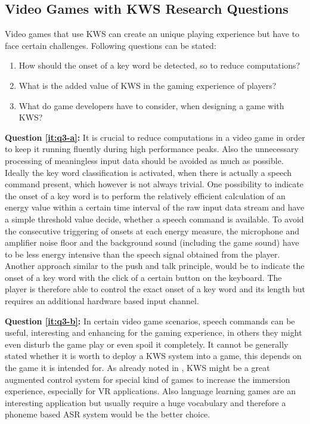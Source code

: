\subsection{Video Games with KWS Research Questions}\label{sec:intro_rq_games}
Video games that use KWS can create an unique playing experience but have to face certain challenges.
Following questions can be stated:
\begin{enumerate}[label={Q.3.\alph*)}, leftmargin=1.75cm]
  \item How should the onset of a key word be detected, so to reduce computations?\label{it:q3-a}
  \item What is the added value of KWS in the gaming experience of players?\label{it:q3-b}
  \item What do game developers have to consider, when designing a game with KWS?\label{it:q3-c}
\end{enumerate}
\noindent
\textbf{Question \ref{it:q3-a}:} 
It is crucial to reduce computations in a video game in order to keep it running fluently during high performance peaks.
Also the unnecessary processing of meaningless input data should be avoided as much as possible.
Ideally the key word classification is activated, when there is actually a speech command present, which however is not always trivial.
One possibility to indicate the onset of a key word is to perform the relatively efficient calculation of an energy value within a certain time interval of the raw input data stream and have a simple threshold value decide, whether a speech command is available. 
To avoid the consecutive triggering of onsets at each energy measure, the microphone and amplifier noise floor and the background sound (including the game sound) have to be less energy intensive than the speech signal obtained from the player.
Another approach similar to the push and talk principle, would be to indicate the onset of a key word with the click of a certain button on the keyboard.
The player is therefore able to control the exact onset of a key word and its length but requires an additional hardware based input channel.

\textbf{Question \ref{it:q3-b}:}
In certain video game scenarios, speech commands can be useful, interesting and enhancing for the gaming experience, in others they might even disturb the game play or even spoil it completely.
It cannot be generally stated whether it is worth to deploy a KWS system into a game, this depends on the game it is intended for.
As already noted in , KWS might be a great augmented control system for special kind of games to increase the immersion experience, especially for VR applications.
Also language learning games are an interesting application but usually require a huge vocabulary and therefore a phoneme based ASR system would be the better choice.

